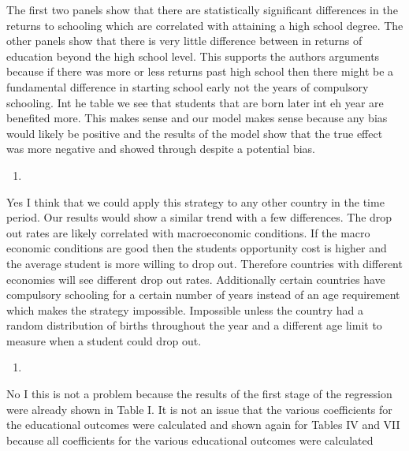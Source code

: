 \documentclass[
  12pt,
  landscape]{article}
\begin{document}
The first two panels show that there are statistically significant
differences in the returns to schooling which are correlated with
attaining a high school degree. The other panels show that there is very
little difference between in returns of education beyond the high school
level. This supports the authors arguments because if there was more or
less returns past high school then there might be a fundamental
difference in starting school early not the years of compulsory
schooling. Int he table we see that students that are born later int eh
year are benefited more. This makes sense and our model makes sense
because any bias would likely be positive and the results of the model
show that the true effect was more negative and showed through despite a
potential bias.

\begin{enumerate}
\def\labelenumi{(\alph{enumi})}
\setcounter{enumi}{3}
\item
\end{enumerate}

Yes I think that we could apply this strategy to any other country in
the time period. Our results would show a similar trend with a few
differences. The drop out rates are likely correlated with macroeconomic
conditions. If the macro economic conditions are good then the students
opportunity cost is higher and the average student is more willing to
drop out. Therefore countries with different economies will see
different drop out rates. Additionally certain countries have compulsory
schooling for a certain number of years instead of an age requirement
which makes the strategy impossible. Impossible unless the country had a
random distribution of births throughout the year and a different age
limit to measure when a student could drop out.

\begin{enumerate}
\def\labelenumi{(\alph{enumi})}
\setcounter{enumi}{4}
\item
\end{enumerate}

No I this is not a problem because the results of the first stage of the
regression were already shown in Table I. It is not an issue that the
various coefficients for the educational outcomes were calculated and
shown again for Tables IV and VII because all coefficients for the
various educational outcomes were calculated
\end{document}
